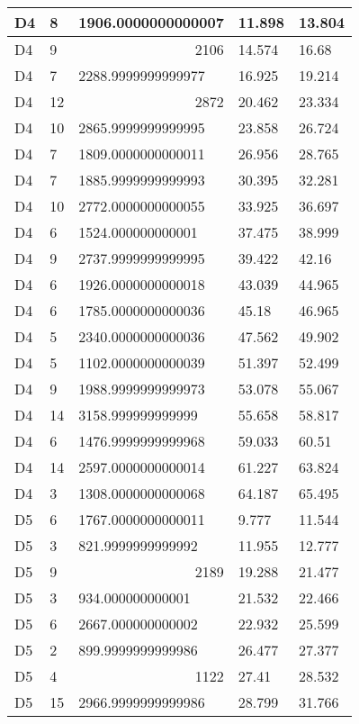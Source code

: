 \begin{longtable}{|l|l|l|l|l|}
D4 & 8 & 1906.0000000000007 & 11.898 & 13.804 \\ \hline
D4 & 9 & \multicolumn{1}{r|}{2106} & 14.574 & 16.68 \\ \hline
D4 & 7 & 2288.9999999999977 & 16.925 & 19.214 \\ \hline
D4 & 12 & \multicolumn{1}{r|}{2872} & 20.462 & 23.334 \\ \hline
D4 & 10 & 2865.9999999999995 & 23.858 & 26.724 \\ \hline
D4 & 7 & 1809.0000000000011 & 26.956 & 28.765 \\ \hline
D4 & 7 & 1885.9999999999993 & 30.395 & 32.281 \\ \hline
D4 & 10 & 2772.0000000000055 & 33.925 & 36.697 \\ \hline
D4 & 6 & 1524.000000000001 & 37.475 & 38.999 \\ \hline
D4 & 9 & 2737.9999999999995 & 39.422 & 42.16 \\ \hline
D4 & 6 & 1926.0000000000018 & 43.039 & 44.965 \\ \hline
D4 & 6 & 1785.0000000000036 & 45.18 & 46.965 \\ \hline
D4 & 5 & 2340.0000000000036 & 47.562 & 49.902 \\ \hline
D4 & 5 & 1102.0000000000039 & 51.397 & 52.499 \\ \hline
D4 & 9 & 1988.9999999999973 & 53.078 & 55.067 \\ \hline
D4 & 14 & 3158.999999999999 & 55.658 & 58.817 \\ \hline
D4 & 6 & 1476.9999999999968 & 59.033 & 60.51 \\ \hline
D4 & 14 & 2597.0000000000014 & 61.227 & 63.824 \\ \hline
D4 & 3 & 1308.0000000000068 & 64.187 & 65.495 \\ \hline
D5 & 6 & 1767.0000000000011 & 9.777 & 11.544 \\ \hline
D5 & 3 & 821.9999999999992 & 11.955 & 12.777 \\ \hline
D5 & 9 & \multicolumn{1}{r|}{2189} & 19.288 & 21.477 \\ \hline
D5 & 3 & 934.000000000001 & 21.532 & 22.466 \\ \hline
D5 & 6 & 2667.000000000002 & 22.932 & 25.599 \\ \hline
D5 & 2 & 899.9999999999986 & 26.477 & 27.377 \\ \hline
D5 & 4 & \multicolumn{1}{r|}{1122} & 27.41 & 28.532 \\ \hline
D5 & 15 & 2966.9999999999986 & 28.799 & 31.766 \\ \hline

\end{longtable}
